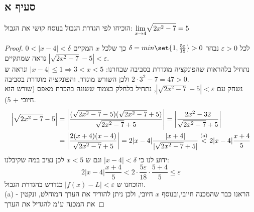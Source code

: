 \documentclass{article}
\DeclarePairedDelimiter\set\{\}
\begin{document}
	\subsection*{סעיף א}
	הוכיחו לפי הגדרת הגבול בנוסח קושי את הגבול: $\displaystyle{\lim_{x \to 4}}\sqrt{2x^2 - 7} = 5$
	\begin{proof}
		לכל $\varepsilon > 0$ נבחר $\delta = min\set{1, \frac{5\varepsilon}{18}} > 0$
		כך שלכל $x$ המקיים $0 < |x - 4| < \delta$ נראה שמתקיים $\left| \sqrt{2x^2 - 7} - 5 \right| < \varepsilon$. \\
		נתחיל בלהראות שהפונקציה מוגדרת בסביבה שבחרנו:
		$|x-4| \leq 1 \Rightarrow 3 < x < 5$ ונראה ש $2 \cdot 3^2-7 = 47 > 0$ ולכן השורש מוגדר, והפונקציה מוגדרת בסביבה. \\
		נשחק עם $\left| \sqrt{2x^2 - 7} - 5 \right| < \varepsilon$, נתחיל בלחלק בצמוד ששונה בהכרח מאפס (שורש הוא חיובי + 5).
		\begin{align*}
			\left| \sqrt{2x^2 - 7} - 5  \right| &=
			\left| \frac{(\sqrt{2x^2 - 7} - 5)(\sqrt{2x^2 - 7} + 5)}{\sqrt{2x^2 - 7} + 5}  \right| =
			\left| \frac{2x^2 - 32}{\sqrt{2x^2 - 7} + 5}  \right| \\
			&= \left| \frac{2(x+4)(x-4)}{\sqrt{2x^2 - 7} + 5}  \right| =
			 2|x-4| \frac{|x+4|}{|\sqrt{2x^2 - 7} + 5|} \overset{\text{(a)}} <
			 2|x-4| \frac{x+4}{5}
		\end{align*}
		ידוע לנו כי $|x-4| < \delta$ וגם ש $x < 5$ לכן נציב במה שקיבלנו:
		\[
			2|x-4| \frac{x+4}{5} <
			2\cdot \frac{5\varepsilon}{18} \cdot \frac{5+4}{5} \leq \varepsilon
		\]
		והוכחנו ש $|f(x) - L| < \varepsilon$ כנדרש בהגדרת הגבול. \\
		(a) - הראנו כבר שהמכנה חיובי,ובנוסף $x$ חיובי, ולכן ניתן להוריד את הערך המוחלט, ונקטין את המכנה ע"מ להגדיל את הערך
	\end{proof}
	\pagebreak
\end{document}

